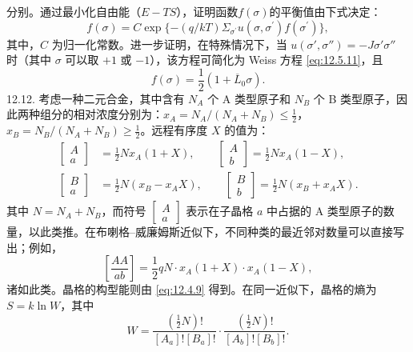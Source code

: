 分别。通过最小化自由能（\(E-TS\)），证明函数\(f(\sigma)\)的平衡值由下式决定：
\begin{equation}\tag{12.13.31}\label{eq:12.13.31}
f ( \sigma ) = C \exp \{ - ( q / k T ) \Sigma _ { \sigma ^{\prime} } u ( \sigma , \sigma ^{\prime} ) f ( \sigma ^{\prime} ) \} ,
\end{equation}
其中，\(C\) 为归一化常数。进一步证明，在特殊情况下，当 \(u(\sigma',\sigma'')=-J\sigma'\sigma''\) 时（其中 \(\sigma\) 可以取 \(+1\) 或 \(-1\)），该方程可简化为 Weiss 方程 \autoref{eq:12.5.11}，且
\[
f(\sigma)=\frac{1}{2}\left(1+\overline{L}_{0}\sigma\right).
\]
12.12. 考虑一种二元合金，其中含有 \(N_A\) 个 A 类型原子和 \(N_B\) 个 B 类型原子，因此两种组分的相对浓度分别为：\(x_A = N_A/(N_A + N_B) \leq \frac{1}{2}\)，\(x_B = N_B/(N_A + N_B) \geq \frac{1}{2}\)。远程有序度 \(X\) 的值为：
\begin{equation}\tag{12.13.32}\label{eq:12.13.32}
\begin{aligned}
\begin{bmatrix} A \\ a \end{bmatrix} &= \frac{1}{2} N x_{A}(1+X), \qquad
\begin{bmatrix} A \\ b \end{bmatrix} = \frac{1}{2} N x_{A}(1-X), \\
\begin{bmatrix} B \\ a \end{bmatrix} &= \frac{1}{2} N (x_{B}-x_{A}X), \qquad
\begin{bmatrix} B \\ b \end{bmatrix} = \frac{1}{2} N (x_{B}+x_{A}X) .
\end{aligned}
\end{equation}
其中 \(N = N_A + N_B\)，而符号 \(\begin{bmatrix} A \\ a \end{bmatrix}\) 表示在子晶格 \(a\) 中占据的 A 类型原子的数量，以此类推。在布喇格--威廉姆斯近似下，不同种类的最近邻对数量可以直接写出；例如，
\begin{equation}\tag{12.13.33}\label{eq:12.13.33}
\left[ { \frac { A A } { a b } } \right] = { \frac { 1 } { 2 } } q N \cdot x _ { A } ( 1 + X ) \cdot x _ { A } ( 1 - X ) ,
\end{equation}
诸如此类。晶格的构型能则由 \autoref{eq:12.4.9} 得到。在同一近似下，晶格的熵为 \(S = k \ln W\)，其中
\begin{equation}\tag{12.13.34}\label{eq:12.13.34}
W = \frac{\left(\frac{1}{2}N\right)!}{\left[ A_a \right]!\left[ B_a \right]!} \cdot \frac{\left(\frac{1}{2}N\right)!}{\left[ A_b \right]!\left[ B_b \right]!} .
\end{equation}

